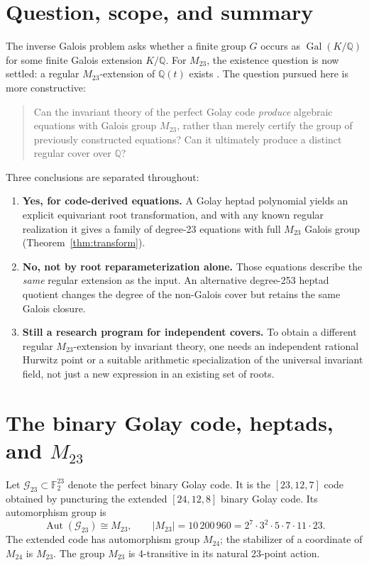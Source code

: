 \documentclass[11pt,letterpaper]{article}
\theoremstyle{definition}
\newcommand{\QQ}{\mathbb{Q}}
\newcommand{\FF}{\mathbb{F}}
\newcommand{\Gal}{\operatorname{Gal}}
\newcommand{\Aut}{\operatorname{Aut}}
\newcommand{\G}{\mathcal{G}_{23}}
\begin{document}
\tableofcontents
\clearpage

\section{Question, scope, and summary}
The inverse Galois problem asks whether a finite group \(G\) occurs as \(\Gal(K/\QQ)\) for some finite Galois extension \(K/\QQ\). For \(M_{23}\), the existence question is now settled: a regular \(M_{23}\)-extension of \(\QQ(t)\) exists \cite[Theorem 1.3]{HJLPPZ26}. The question pursued here is more constructive:
\begin{quote}
Can the invariant theory of the perfect Golay code \emph{produce} algebraic equations with Galois group \(M_{23}\), rather than merely certify the group of previously constructed equations? Can it ultimately produce a distinct regular cover over \(\QQ\)?
\end{quote}

Three conclusions are separated throughout:
\begin{enumerate}[label=\textbf{\arabic*.}]
\item \textbf{Yes, for code-derived equations.} A Golay heptad polynomial yields an explicit equivariant root transformation, and with any known regular realization it gives a family of degree-23 equations with full \(M_{23}\) Galois group (Theorem~\ref{thm:transform}).
\item \textbf{No, not by root reparameterization alone.} Those equations describe the \emph{same} regular extension as the input. An alternative degree-253 heptad quotient changes the degree of the non-Galois cover but retains the same Galois closure.
\item \textbf{Still a research program for independent covers.} To obtain a different regular \(M_{23}\)-extension by invariant theory, one needs an independent rational Hurwitz point or a suitable arithmetic specialization of the universal invariant field, not just a new expression in an existing set of roots.
\end{enumerate}

\section{The binary Golay code, heptads, and \(M_{23}\)}
Let \(\G\subset\FF_2^{23}\) denote the perfect binary Golay code. It is the \([23,12,7]\) code obtained by puncturing the extended \([24,12,8]\) binary Golay code. Its automorphism group is
\[
\Aut(\G)\cong M_{23},\qquad |M_{23}|=10\,200\,960=2^7\cdot3^2\cdot5\cdot7\cdot11\cdot23.
\]
The extended code has automorphism group \(M_{24}\); the stabilizer of a coordinate of \(M_{24}\) is \(M_{23}\). The group \(M_{23}\) is 4-transitive in its natural 23-point action.
\end{document}
